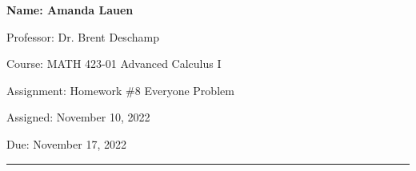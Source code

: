 \documentclass[10pt]{article}
\theoremstyle{definition}
\begin{document}
\pagestyle{empty}  %

\begin{center}  %

{\bf 
Name: Amanda Lauen

Professor: Dr. Brent Deschamp

Course: MATH 423-01  Advanced Calculus I

Assignment: Homework \#8 Everyone Problem 

Assigned: November 10, 2022

Due: November 17, 2022
}

\end{center}

\medskip

\hrule   %

\bigskip

\end{document}
